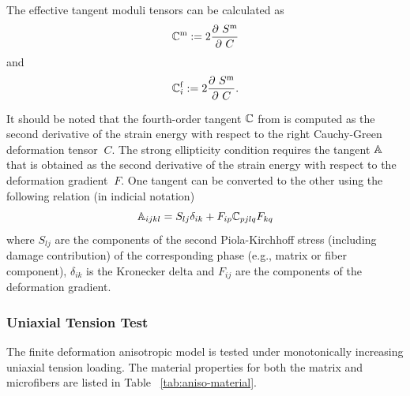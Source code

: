\documentclass[12pt]{article}
\newcommand{\mtrx}{{\text{m}}}
\newcommand{\fiber}{{\text{f}}}
\numberwithin{equation}{section}
\begin{document}
The effective tangent moduli tensors can be calculated as
\begin{equation}\label{eq:aniso-tangent1}
  \bbC^\mtrx
  :=
  2 \frac{\partial ~S^\mtrx}{\partial~C}
\end{equation}
and
\begin{equation}\label{eq:aniso-tangent2}
  \bbC^\fiber_i
  :=
  2 \frac{\partial ~S^\mtrx}{\partial~C}.
\end{equation}

It should be noted that the fourth-order tangent $\mathbb{C}$ from
 is computed as the second derivative of the
strain energy with respect to the right Cauchy-Green deformation
tensor $~C$. The strong ellipticity condition
 requires the tangent $\mathbb{A}$ that is
obtained as the second derivative of the strain energy with respect to
the deformation gradient $~F$. One tangent can be converted to the
other using the following relation (in indicial notation)
\begin{equation}\label{eq:aniso-tangent3}
  \mathbb{A}_{ijkl} = S_{lj} \delta_{ik}
    + F_{ip} \mathbb{C}_{pjlq} F_{kq}
\end{equation}
where $S_{lj}$ are the components of the second Piola-Kirchhoff stress
(including damage contribution) of the corresponding phase (e.g.,
matrix or fiber component), $\delta_{ik}$ is the Kronecker delta and
$F_{ij}$ are the components of the deformation gradient.

\subsubsection{Uniaxial Tension Test}

The finite deformation anisotropic model is tested under monotonically
increasing uniaxial tension loading. The material properties for both
the matrix and microfibers are listed in Table~
\ref{tab:aniso-material}.
\end{document}
